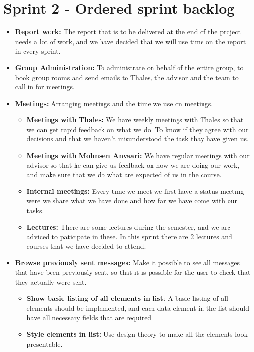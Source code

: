 \section{Sprint 2 - Ordered sprint backlog}

\begin{itemize}
\item{}\textbf{Report work:} The report that is to be delivered at the end of the project needs a lot of work, and we have decided that we will use time on the report in every sprint.
\item{}\textbf{Group Administration:} To administrate on behalf of the entire group, to book group rooms and send emails to Thales, the advisor and the team to call in for meetings.
\item{}\textbf{Meetings:} Arranging meetings and the time we use on meetings.
\begin{itemize}
\item{}\textbf{Meetings with Thales:} We have weekly meetings with Thales so that we can get rapid feedback on what we do. To know if they agree with our decisions and that we haven't misunderstood the task thay have given us.
\item{}\textbf{Meetings with Mohnsen Anvaari:} We have regular meetings with our advisor so that he can give us feedback on how we are doing our work, and make sure that we do what are expected of us in the course.
\item{}\textbf{Internal meetings:} Every time we meet we first have a status meeting were we share what we have done and how far we have come with our tasks.
\item{}\textbf{Lectures:} There are some lectures during the semester, and we are adviced to paticipate in these. In this sprint there are 2 lectures and courses that we have decided to attend.
\end{itemize}
\item{}\textbf{Browse previously sent messages:} Make it possible to see all messages that have been previously sent, so that it is possible for the user to check that they actually were sent.
\begin{itemize}
\item{}\textbf{Show basic listing of all elements in list:} A basic listing of all elements should be implemented, and each data element in the list should have all necessary fields that are required.
\item{}\textbf{Style elements in list:} Use design theory to make all the elements look presentable.

\end{itemize}
\end{itemize}
